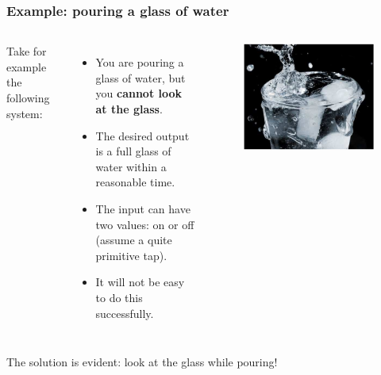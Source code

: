 \begin{frame}
	\frametitle{Example: pouring a glass of water}
	\begin{columns}[c]
		
		Take for example the following system:\\
		\begin{itemize}
			\item You are pouring a glass of water, but you \textbf{cannot look at the glass}.
			\item The desired output is a full glass of water within a reasonable time.
			\item The input can have two values: on or off (assume a quite primitive tap).
			\item It will not be easy to do this successfully.
		\end{itemize}
		
		\begin{figure}
			\includegraphics[width=1\linewidth]{glass}
		\end{figure}
		
	\end{columns}
	\bigskip
	The solution is evident: look at the glass while pouring!
\end{frame}

